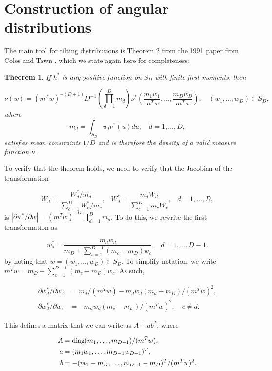 \documentclass[10pt]{report}
\newtheorem{theorem}{Theorem}
\begin{document}
\section{Construction of angular distributions}
\label{sec:tilting}

The main tool for tilting distributions is Theorem 2 from the 1991 paper from Coles and Tawn \cite{ColesTawn}, which we state again here for completeness:\\


\begin{theorem}

If $h^*$ is any positive function on $S_D$ with finite first moments, then

$$
\nu(w) = (m^Tw)^{-(D+1)}D^{-1} \left( \prod_{d=1}^{D}m_d \right) \nu^*\left(\frac{m_1w_1}{m^Tw}, \ldots , \frac{m_Dw_D}{m^Tw}\right),
\quad (w_1,\ldots,w_D) \in S_D,
$$
where
$$
m_d = \int_{S_D} u_d\nu^*(u)du, \quad d=1, \ldots ,D,
$$
satisfies mean constraints $1/D$ and is therefore the density of a valid measure function $\nu$.

\end{theorem}

To verify that the theorem holds, we need to verify that the Jacobian of the transformation

$$
W_d = \dfrac{W^*_d/m_d}{\sum_{c=1}^{D}W_c^*/m_c},\hspace{10pt}
W_d^* = \frac{m_dW_d}{\sum_{c=1}^{D}m_cW_c},\hspace{10pt}
d=1,\ldots,D,
$$
is $|\partial w^*/\partial w | = (m^Tw)^{-D} \prod_{d=1}^{D}m_d$.
To do this, we rewrite the first transformation as

$$
w_s^* = \frac{m_dw_d}{m_D+\sum_{c=1}^{D-1}(m_c - m_D)w_c}, \hspace{10pt}
d=1,\ldots,D-1.
$$
by noting that $w=(w_1,\ldots,w_D) \in S_D$. To simplify notation, we write
$m^Tw = m_D + \sum_{c=1}^{D-1}(m_c - m_D)w_c$. As such,

\begin{align*}
\partial w_d^*/\partial w_d &= m_d/(m^Tw) - m_dw_d(m_d - m_D)/(m^Tw)^2 , \\
\partial w_d^*/\partial w_c &= - m_dw_d (m_c - m_D)/(m^Tw)^2, \quad c\neq d.
\end{align*}

This defines a matrix that we can write as $A + ab^T$, where

\begin{align*}
A &= {\rm diag}(m_1,\ldots,m_{D-1})/(m^Tw) , \\
a &= (m_1w_1,\ldots,m_{D-1}w_{D-1})^T , \\
b &= -(m_1 - m_D,\ldots,m_{D-1} - m_D)^T/(m^Tw)^2.
\end{align*}
\end{document}
